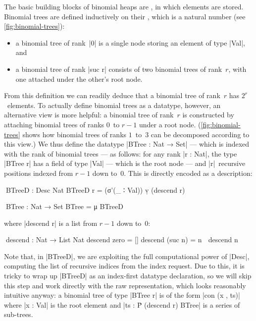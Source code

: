 The basic building blocks of binomial heaps are , in which elements are stored.
Binomial trees are defined inductively on their , which is a natural number (see \autoref{fig:binomial-trees}):
\begin{itemize}
\item a binomial tree of rank~|0| is a single node storing an element of type |Val|, and
\item a binomial tree of rank |suc r| consists of two binomial trees of rank~$r$, with one attached under the other's root node.
\end{itemize}
From this definition we can readily deduce that a binomial tree of rank~$r$ has $2^r$~elements.
To actually define binomial trees as a datatype, however, an alternative view is more helpful: a binomial tree of rank~$r$ is constructed by attaching binomial trees of ranks $0$~to $r-1$ under a root node.
(\autoref{fig:binomial-trees} shows how binomial trees of ranks $1$~to~$3$ can be decomposed according to this view.)
We thus define the datatype |BTree : Nat → Set| --- which is indexed with the rank of binomial trees --- as follows: for any rank |r : Nat|, the type |BTree r| has a field of type |Val| --- which is the root node --- and |r|~recursive positions indexed from $r-1$ down to~$0$.
This is directly encoded as a description:
\begin{code}
^^^BTreeD : Desc Nat
BTreeD r = (σ'(_ ∶ Val)) ṿ (descend r)

^^^BTree : Nat → Set
BTree = μ BTreeD
\end{code}
where |descend r| is a list from $r-1$ down to~$0$:
\begin{code}
^^^descend : Nat → List Nat
descend zero     =  []
descend (suc n)  =  n ∷ descend n
\end{code}
Note that, in |BTreeD|, we are exploiting the full computational power of |Desc|, computing the list of recursive indices from the index request.
Due to this, it is tricky to wrap up |BTreeD| as an index-first datatype declaration, so we will skip this step and work directly with the raw representation, which looks reasonably intuitive anyway: a binomial tree of type |BTree r| is of the form |con (x , ts)| where |x : Val| is the root element and |ts : Ṗ (descend r) BTree| is a series of sub-trees.

